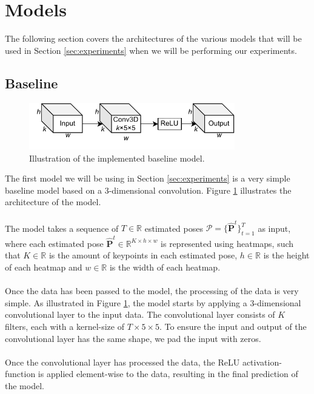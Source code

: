 \documentclass[./main.tex]{subfiles}
\begin{document}
\section{Models}
The following section covers the architectures of the various models that will be used in Section \ref{sec:experiments} when we will be performing our experiments. 

\subsection{Baseline}
\begin{figure}[htbp]
    \centering
    \includegraphics[width=0.8\textwidth]{./entities/baseline.pdf}
    \caption{Illustration of the implemented baseline model.}
    \label{fig:baseline}
\end{figure}

\noindent The first model we will be using in Section \ref{sec:experiments} is a very simple baseline model based on a 3-dimensional convolution. Figure \ref{fig:baseline} illustrates the architecture of the model.
\\
\\
The model takes a sequence of $T \in \mathbb{R}$ estimated poses $\hat{\mathcal{P}} = \{\hat{\bm{P}}^t\}_{t = 1} ^T$ as input, where each estimated pose $\hat{\bm{P}}^t \in \mathbb{R}^{K \times h \times w}$ is represented using heatmaps, such that $K \in \mathbb{R}$ is the amount of keypoints in each estimated pose, $h \in \mathbb{R}$ is the height of each heatmap and $w \in \mathbb{R}$ is the width of each heatmap.
\\
\\
Once the data has been passed to the model, the processing of the data is very simple. As illustrated in Figure \ref{fig:baseline}, the model starts by applying a 3-dimensional convolutional layer to the input data. The convolutional layer consists of $K$ filters, each with a kernel-size of $T \times 5 \times 5$. To ensure the input and output of the convolutional layer has the same shape, we pad the input with zeros.
\\
\\
Once the convolutional layer has processed the data, the ReLU activation-function is applied element-wise to the data, resulting in the final prediction of the model.
\end{document}
